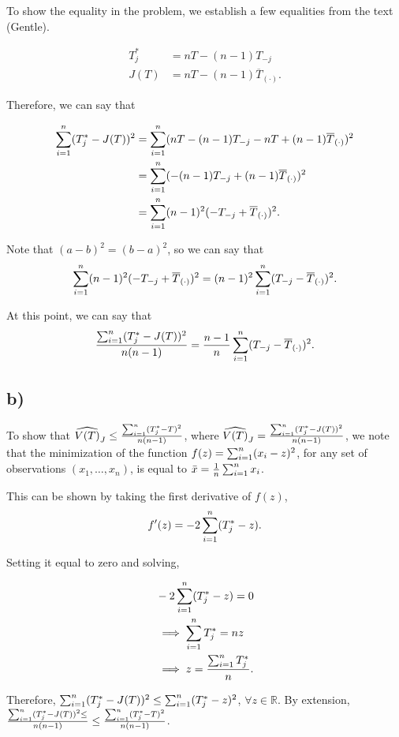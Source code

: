 \documentclass[]{article}
\begin{document}
To show the equality in the problem, we establish a few equalities from
the text (Gentle).

\begin{align}
T^*_j &= nT - (n-1)T_{-j} \\
J(T) &= nT - (n-1) \overline{T}_{(\cdot)}.
\end{align}

Therefore, we can say that

\begin{align*}
\sum_{i=1}^n(T^*_j - J(T))^2 &= \sum_{i=1}^n(nT - (n-1)T_{-j} - nT + (n-1)\overline{T}_{(\cdot)} )^2 \\
&= \sum_{i=1}^n(- (n-1)T_{-j} + (n-1) \overline{T}_{(\cdot)})^2 \\
&= \sum_{i=1}^n(n-1)^2 (-T_{-j} + \overline{T}_{(\cdot)})^2.
\end{align*}

Note that \((a - b)^2 = (b -a)^2\), so we can say that \[
\sum_{i=1}^n(n-1)^2 (-T_{-j} + \overline{T}_{(\cdot)})^2 = (n-1)^2 \sum_{i=1}^n (T_{-j} - \overline{T}_{(\cdot)})^2.
\]

At this point, we can say that \[
\frac{\sum_{i=1}^n(T^*_j - J(T))^2 }{n (n-1)} = \frac{n-1}{n}\sum_{i=1}^n(T_{-j} - \overline{T}_{(\cdot)})^2.
\]

\subsection{b)}\label{b-1}

To show that
\(\widehat{V(T)}_J \leq \frac{\sum_{i=1}^n (T^*_j - T)^2}{n(n-1)}\), where
\(\widehat{V(T)}_J = \frac{\sum_{i=1}^n (T^*_j - J(T))^2}{n(n-1)}\), we note
that the minimization of the function \(f(z) = \sum_{i=1}^n(x_i - z)^2\), for
any set of observations \((x_1, \ldots, x_n)\), is equal to
\(\bar{x} = \frac{1}{n}\sum_{i=1}^n{x_i}\).

This can be shown by taking the first derivative of \(f(z)\), \[
f^\prime(z) = -2 \sum_{i=1}^n(T^*_j - z).
\]

Setting it equal to zero and solving,

\begin{align*}
&-2 \sum_{i=1}^n(T^*_j - z) = 0 \\
&\implies \sum_{i=1}^n T^*_j = nz  \\
&\implies z = \frac{\sum_{i=1}^n T^*_j}{n}.
\end{align*}

Therefore, \(\sum_{i=1}^n (T^*_j - J(T))^2 \leq \sum_{i=1}^n (T^*_j - z)^2\),
\(\forall z \in \mathbb{R}\). By extension,
\(\frac{\sum_{i=1}^n (T^*_j - J(T))^2 \leq}{n(n-1)} \leq \frac{\sum_{i=1}^n (T^*_j - T)^2 }{n(n-1)}\).
\end{document}

